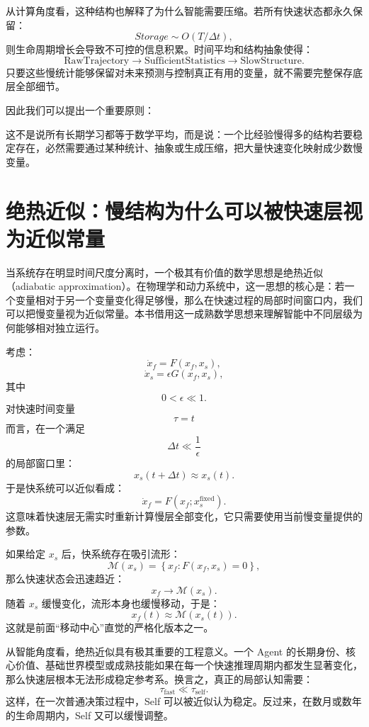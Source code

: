 从计算角度看，这种结构也解释了为什么智能需要压缩。若所有快速状态都永久保留：
\[
Storage
\sim
O(T/\Delta t),
\]
则生命周期增长会导致不可控的信息积累。时间平均和结构抽象使得：
\[
\text{RawTrajectory}
\rightarrow
\text{SufficientStatistics}
\rightarrow
\text{SlowStructure}.
\]
只要这些慢统计能够保留对未来预测与控制真正有用的变量，就不需要完整保存底层全部细节。

因此我们可以提出一个重要原则：
\begin{statementbox}
\centering
{}
\end{statementbox}
这不是说所有长期学习都等于数学平均，而是说：一个比经验慢得多的结构若要稳定存在，必然需要通过某种统计、抽象或生成压缩，把大量快速变化映射成少数慢变量。

\section{绝热近似：慢结构为什么可以被快速层视为近似常量}

当系统存在明显时间尺度分离时，一个极其有价值的数学思想是绝热近似（adiabatic approximation）。在物理学和动力系统中，这一思想的核心是：若一个变量相对于另一个变量变化得足够慢，那么在快速过程的局部时间窗口内，我们可以把慢变量视为近似常量。本书借用这一成熟数学思想来理解智能中不同层级为何能够相对独立运行。

考虑：
\[
\dot{x}_f
=
F(x_f,x_s),
\]
\[
\dot{x}_s
=
\epsilon
G(x_f,x_s),
\]
其中
\[
0<\epsilon\ll1.
\]
对快速时间变量
\[
\tau=t
\]
而言，在一个满足
\[
\Delta t
\ll
\frac{1}{\epsilon}
\]
的局部窗口里：
\[
x_s(t+\Delta t)
\approx
x_s(t).
\]
于是快系统可以近似看成：
\[
\dot{x}_f
=
F
\left(
x_f;
x_s^{\mathrm{fixed}}
\right).
\]
这意味着快速层无需实时重新计算慢层全部变化，它只需要使用当前慢变量提供的参数。

如果给定 $x_s$ 后，快系统存在吸引流形：
\[
\mathcal{M}(x_s)
=
\left\{
x_f:
F(x_f,x_s)=0
\right\},
\]
那么快速状态会迅速趋近：
\[
x_f
\rightarrow
\mathcal{M}(x_s).
\]
随着 $x_s$ 缓慢变化，流形本身也缓慢移动，于是：
\[
x_f(t)
\approx
\mathcal{M}
\left(
x_s(t)
\right).
\]
这就是前面“移动中心”直觉的严格化版本之一。

从智能角度看，绝热近似具有极其重要的工程意义。一个 Agent 的长期身份、核心价值、基础世界模型或成熟技能如果在每一个快速推理周期内都发生显著变化，那么快速层根本无法形成稳定参考系。换言之，真正的局部认知需要：
\[
\tau_{\mathrm{fast}}
\ll
\tau_{\mathrm{self}}.
\]
这样，在一次普通决策过程中，Self 可以被近似认为稳定。反过来，在数月或数年的生命周期内，Self 又可以缓慢调整。

